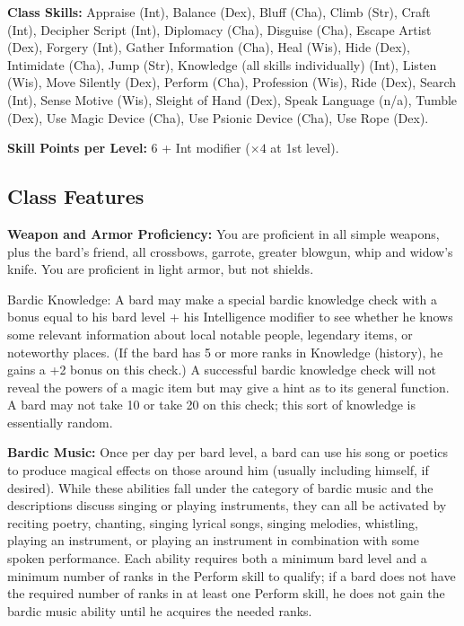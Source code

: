 \textbf{Class Skills:} Appraise (Int), Balance (Dex), Bluff (Cha), Climb (Str), Craft (Int), Decipher Script (Int), Diplomacy (Cha), Disguise (Cha), Escape Artist (Dex), Forgery (Int), Gather Information (Cha), Heal (Wis), Hide (Dex), Intimidate (Cha), Jump (Str), Knowledge (all skills individually) (Int), Listen (Wis), Move Silently (Dex), Perform (Cha), Profession (Wis), Ride (Dex), Search (Int), Sense Motive (Wis), Sleight of Hand (Dex), Speak Language (n/a), Tumble (Dex), Use Magic Device (Cha), Use Psionic Device (Cha), Use Rope (Dex).

\textbf{Skill Points per Level:} 6 + Int modifier ($\times4$ at 1st level).

\subsection{Class Features}

\textbf{Weapon and Armor Proficiency:} You are proficient in all simple weapons, plus the bard's friend, all crossbows, garrote, greater blowgun, whip and widow's knife. You are proficient in light armor, but not shields.

Bardic Knowledge: A bard may make a special bardic knowledge check with a bonus equal to his bard level + his Intelligence modifier to see whether he knows some relevant information about local notable people, legendary items, or noteworthy places. (If the bard has 5 or more ranks in Knowledge (history), he gains a +2 bonus on this check.)
A successful bardic knowledge check will not reveal the powers of a magic item but may give a hint as to its general function. A bard may not take 10 or take 20 on this check; this sort of knowledge is essentially random.


\textbf{Bardic Music:} Once per day per bard level, a bard can use his song or poetics to produce magical effects on those around him (usually including himself, if desired). While these abilities fall under the category of bardic music and the descriptions discuss singing or playing instruments, they can all be activated by reciting poetry, chanting, singing lyrical songs, singing melodies, whistling, playing an instrument, or playing an instrument in combination with some spoken performance. Each ability requires both a minimum bard level and a minimum number of ranks in the Perform skill to qualify; if a bard does not have the required number of ranks in at least one Perform skill, he does not gain the bardic music ability until he acquires the needed ranks.

